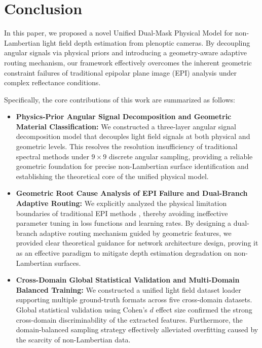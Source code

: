 \section{Conclusion}

In this paper, we proposed a novel Unified Dual-Mask Physical Model for non-Lambertian light field depth estimation from plenoptic cameras. By decoupling angular signals via physical priors and introducing a geometry-aware adaptive routing mechanism, our framework effectively overcomes the inherent geometric constraint failures of traditional epipolar plane image (EPI) analysis under complex reflectance conditions. 

Specifically, the core contributions of this work are summarized as follows:
\begin{itemize}
    \item \textbf{Physics-Prior Angular Signal Decomposition and Geometric Material Classification:} We constructed a three-layer angular signal decomposition model that decouples light field signals at both physical and geometric levels. This resolves the resolution insufficiency of traditional spectral methods under $9 \times 9$ discrete angular sampling, providing a reliable geometric foundation for precise non-Lambertian surface identification and establishing the theoretical core of the unified physical model.
    \item \textbf{Geometric Root Cause Analysis of EPI Failure and Dual-Branch Adaptive Routing:} We explicitly analyzed the physical limitation boundaries of traditional EPI methods \cite{epinet2018baseline}, thereby avoiding ineffective parameter tuning in loss functions and learning rates. By designing a dual-branch adaptive routing mechanism guided by geometric features, we provided clear theoretical guidance for network architecture design, proving it as an effective paradigm to mitigate depth estimation degradation on non-Lambertian surfaces.
    \item \textbf{Cross-Domain Global Statistical Validation and Multi-Domain Balanced Training:} We constructed a unified light field dataset loader supporting multiple ground-truth formats across five cross-domain datasets. Global statistical validation using Cohen's $d$ effect size confirmed the strong cross-domain discriminability of the extracted features. Furthermore, the domain-balanced sampling strategy effectively alleviated overfitting caused by the scarcity of non-Lambertian data.
\end{itemize}

